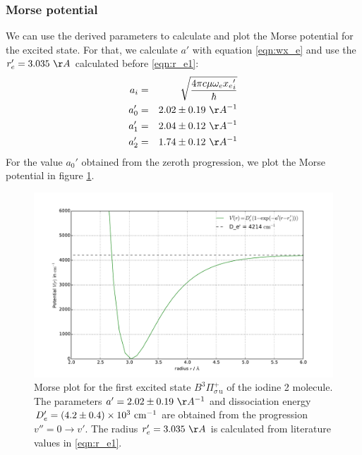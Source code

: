 \subsubsection{Morse potential}
We can use the derived parameters to calculate and plot the Morse potential for the 
excited state. For that, we calculate $a'$ with equation \eqref{eqn:wx_e} and 
use the $r_e' = 3.035 \ \AA$ calculated before \eqref{eqn:r_e1}:
\begin{eqnarray}
    a_i &=& \sqrt{\frac{4 \pi c \mu {\omega_e x_e}_i'}{\hbar}} \\
    a_0' &=& 2.02 \pm 0.19 \ \AA^{-1} \\
    a_1' &=& 2.04 \pm 0.12 \ \AA^{-1} \\
    a_2' &=& 1.74 \pm 0.12 \ \AA^{-1} \\
\end{eqnarray}
For the value $a_0'$ obtained from the zeroth progression, we plot the Morse potential 
in figure \ref{fig:morse}.

\begin{figure}
    \centering
    \includegraphics[width=\pltw]{analysis/figures/morse_plot_0.pdf}
    \caption{Morse plot for the first excited state 
    $B ^3\Pi_{\sigma \, \mathrm{u}}^{+}$ of the iodine 2 molecule. 
    The parameters $a' = 2.02 \pm 0.19\ \AA^{-1}$ and dissociation energy 
    $D_e' = \left(4.2 \pm 0.4\right) \times 10^{3} \ \mathrm{cm^{-1}}$
    are obtained from the progression $v'' = 0 \rightarrow v'$. 
    The radius $r_e' = 3.035 \ \AA$ is calculated from literature values in \eqref{eqn:r_e1}. 
    }
    \label{fig:morse}
\end{figure}

\FloatBarrier

